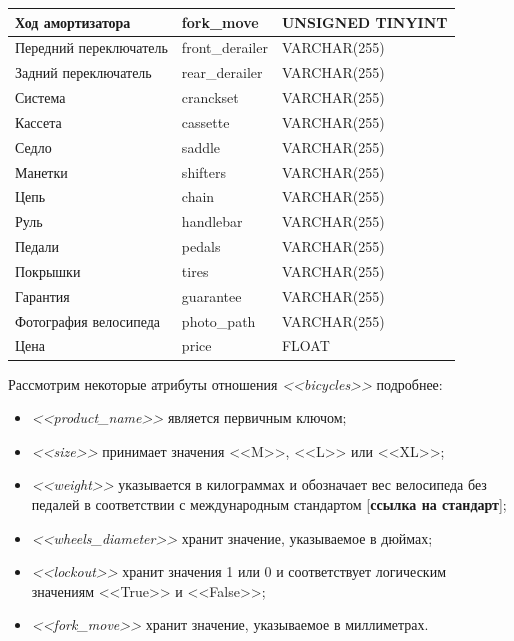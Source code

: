 \begin{table}[h!]
{\begin{tabular}{| p{} | p{} | p{} |}
      \hline
      Ход амортизатора & fork\_move & UNSIGNED TINYINT \\

      \hline
      Передний переключатель & front\_derailer & VARCHAR(255) \\

      \hline
      Задний переключатель & rear\_derailer & VARCHAR(255) \\

      \hline
      Система & cranckset & VARCHAR(255) \\

      \hline
      Кассета & cassette & VARCHAR(255) \\

      \hline
      Седло & saddle & VARCHAR(255) \\

      \hline
      Манетки & shifters & VARCHAR(255) \\

      \hline
      Цепь & chain & VARCHAR(255) \\

      \hline
      Руль & handlebar & VARCHAR(255) \\

      \hline
      Педали & pedals & VARCHAR(255) \\

      \hline
      Покрышки & tires & VARCHAR(255) \\

      \hline
      Гарантия & guarantee & VARCHAR(255) \\

      \hline
      Фотография велосипеда & photo\_path & VARCHAR(255) \\

      \hline
      Цена & price & FLOAT \\

      \hline
    \end{tabular}
  }
\end{table}

Рассмотрим некоторые атрибуты отношения \textit{<<bicycles>>} подробнее:
\begin{itemize}
  \item \textit{<<product\_name>>} является первичным ключом;
  \item \textit{<<size>>} принимает значения <<M>>, <<L>> или <<XL>>;
  \item \textit{<<weight>>} указывается в килограммах и обозначает вес велосипеда
    без педалей в соответствии с международным стандартом [\textbf{ссылка на стандарт}];
  \item \textit{<<wheels\_diameter>>} хранит значение, указываемое в дюймах;
  \item \textit{<<lockout>>} хранит значения 1 или 0 и соответствует логическим 
    значениям <<True>> и <<False>>;
  \item \textit{<<fork\_move>>} хранит значение, указываемое в миллиметрах.
\end{itemize}

